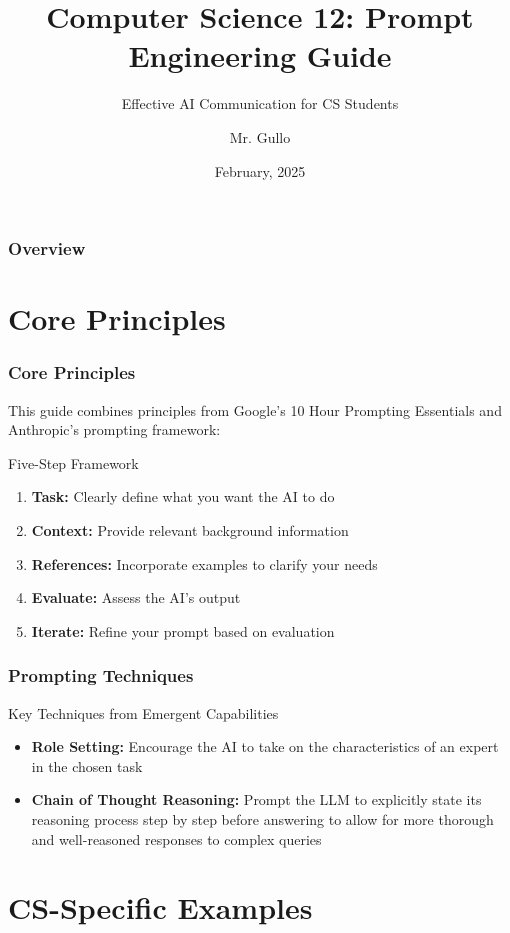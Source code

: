\documentclass{beamer}
\title[Prompt Engineering]{Computer Science 12: Prompt Engineering Guide}
\subtitle{Effective AI Communication for CS Students}
\author[Mr. Gullo]{Mr. Gullo}
\date[Feb 2025]{February, 2025}
\institute[CS Dept.]{Department of Computer Science}
\begin{document}
\frame{\titlepage}

\begin{frame}
\frametitle{Overview}
\tableofcontents
\end{frame}

\section{Core Principles}
\frame{\sectionpage}
\begin{frame}
\frametitle{Core Principles}
This guide combines principles from Google's 10 Hour Prompting Essentials and Anthropic's prompting framework:

\begin{block}{Five-Step Framework}
\begin{enumerate}
\item \textbf{Task:} Clearly define what you want the AI to do
\item \textbf{Context:} Provide relevant background information
\item \textbf{References:} Incorporate examples to clarify your needs
\item \textbf{Evaluate:} Assess the AI's output
\item \textbf{Iterate:} Refine your prompt based on evaluation
\end{enumerate}
\end{block}
\end{frame}

\begin{frame}
\frametitle{Prompting Techniques}
\begin{block}{Key Techniques from Emergent Capabilities}
\begin{itemize}
\item \textbf{Role Setting:} Encourage the AI to take on the characteristics of an expert in the chosen task
\item \textbf{Chain of Thought Reasoning:} Prompt the LLM to explicitly state its reasoning process step by step before answering to allow for more thorough and well-reasoned responses to complex queries
\end{itemize}
\end{block}
\end{frame}

\section{CS-Specific Examples}
\frame{\sectionpage}
\end{document}

